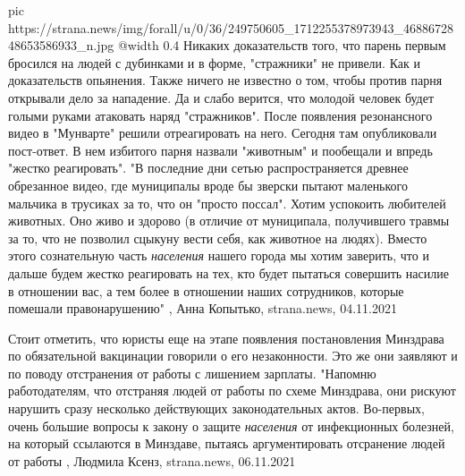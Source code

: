 \ifcmt
  pic https://strana.news/img/forall/u/0/36/249750605_1712255378973943_4688672848653586933_n.jpg
  @width 0.4
\fi
Никаких доказательств того, что парень первым бросился на людей с дубинками и в
форме, "стражники" не привели. Как и доказательств опьянения. Также ничего не
известно о том, чтобы против парня открывали дело за нападение.  Да и слабо
верится, что молодой человек будет голыми руками атаковать наряд "стражников".
После появления резонансного видео в "Мунварте" решили отреагировать на него.
Сегодня там опубликовали пост-ответ. В нем избитого парня назвали "животным" и
пообещали и впредь "жестко реагировать".  "В последние дни сетью
распространяется древнее обрезанное видео, где муниципалы вроде бы зверски
пытают маленького мальчика в трусиках за то, что он "просто поссал".  Хотим
успокоить любителей животных. Оно живо и здорово (в отличие от муниципала,
получившего травмы за то, что не позволил сцыкуну вести себя, как животное на
людях).  Вместо этого сознательную часть \emph{населения} нашего города мы
хотим заверить, что и дальше будем жестко реагировать на тех, кто будет
пытаться совершить насилие в отношении вас, а тем более в отношении наших
сотрудников, которые помешали правонарушению"
, 
Анна Копытько, strana.news, 04.11.2021

Стоит отметить, что юристы еще на этапе появления постановления Минздрава по
обязательной вакцинации говорили о его незаконности.  Это же они заявляют и по
поводу отстранения от работы с лишением зарплаты.  "Напомню работодателям, что
отстраняя людей от работы по схеме Минздрава, они рискуют нарушить сразу
несколько действующих законодательных актов.  Во-первых, очень большие вопросы
к закону о защите \emph{населения} от инфекционных болезней, на который ссылаются в
Минздаве, пытаясь аргументировать отсранение людей от работы
, 
Людмила Ксенз, strana.news, 06.11.2021

